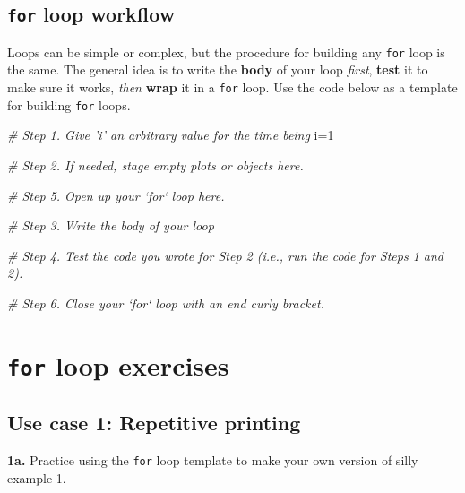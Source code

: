 \documentclass[
]{book}
\newenvironment{Shaded}{\begin{snugshade}}{\end{snugshade}}
\newcommand{\CommentTok}[1]{\textcolor[rgb]{0.56,0.35,0.01}{\textit{#1}}}
\newcommand{\DecValTok}[1]{\textcolor[rgb]{0.00,0.00,0.81}{#1}}
\newcommand{\NormalTok}[1]{#1}
\begin{document}
\hypertarget{for-loop-workflow}{%
\subsection*{\texorpdfstring{\texttt{for} loop workflow}{for loop workflow}}\label{for-loop-workflow}}

Loops can be simple or complex, but the procedure for building any \texttt{for} loop is the same. The general idea is to write the \textbf{body} of your loop \emph{first}, \textbf{test} it to make sure it works, \emph{then} \textbf{wrap} it in a \texttt{for} loop. Use the code below as a template for building \texttt{for} loops.

\begin{Shaded}
\begin{Highlighting}[]
\CommentTok{# Step 1. Give 'i' an arbitrary value for the time being}
\NormalTok{i=}\DecValTok{1} 

\CommentTok{# Step 2. If needed, stage empty plots or objects here.}


\CommentTok{# Step 5. Open up your `for` loop here.}


\CommentTok{# Step 3. Write the body of your loop}


\CommentTok{# Step 4. Test the code you wrote for Step 2 (i.e., run the code for Steps 1 and 2).}


\CommentTok{# Step 6. Close your `for` loop with an end curly bracket.}
\end{Highlighting}
\end{Shaded}

\hypertarget{for-loop-exercises}{%
\section*{\texorpdfstring{\texttt{for} loop exercises}{for loop exercises}}\label{for-loop-exercises}}

\hypertarget{use-case-1-repetitive-printing}{%
\subsection*{Use case 1: Repetitive printing}\label{use-case-1-repetitive-printing}}

\textbf{1a.} Practice using the \texttt{for} loop template to make your own version of silly example 1.
\end{document}
